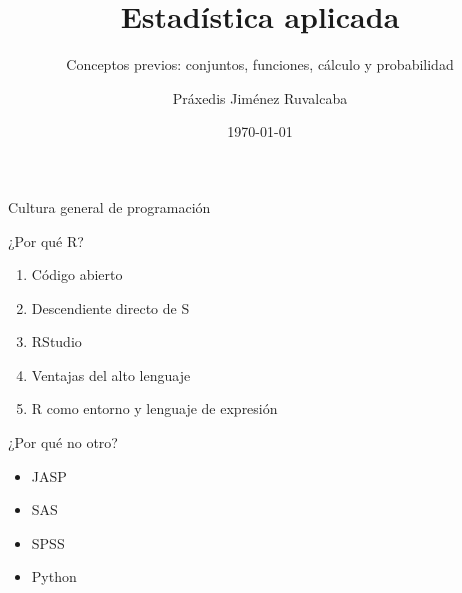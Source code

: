 \documentclass[aspectratio=169,xcolor=dvipsnames]{beamer}
\title{Estadística aplicada}
\subtitle{Conceptos previos: conjuntos, funciones, cálculo y probabilidad}
\author{Práxedis Jiménez Ruvalcaba}
\institute
{

}
\date{\today}
\begin{document}
\begin{frame}[c]

    \vspace{1cm}
    \begin{center}
        \insertauthor\par
        \vspace{0.5cm}
        \insertinstitute\par
        \insertdate
    \end{center}
    
\end{frame}

\begin{section}{Cultura general de programación}

\begin{frame}{¿Por qué R?}
    \begin{enumerate}
        \item Código abierto
        \item Descendiente directo de S 
        \item RStudio
        \item Ventajas del alto lenguaje
        \item R como entorno y lenguaje de expresión
    \end{enumerate} 
\end{frame}

\begin{frame}{¿Por qué no otro?}
    \begin{itemize}
        \item JASP
        \item SAS
        \item SPSS
        \item Python
    \end{itemize}
\end{frame}

\end{section}
\end{document}
